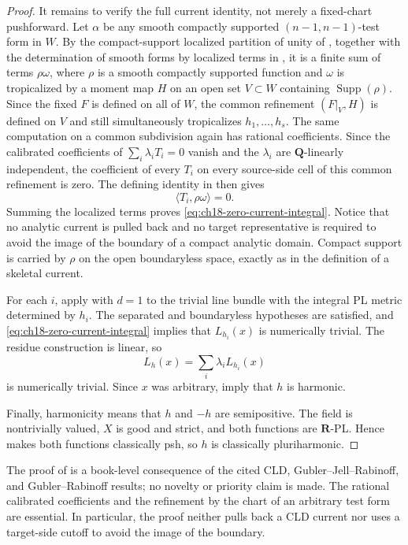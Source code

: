 \begin{proof}
It remains to verify the full current identity, not merely a fixed-chart
pushforward.  Let \(\alpha\) be any smooth compactly supported
\((n-1,n-1)\)-test form in \(W\).  By the compact-support localized partition of
unity of \cite[Corollary~6.2.8]{CLD25}, together with the determination of
smooth forms by localized terms in \cite[Lemma~7.2.5]{CLD25}, it is a
finite sum of terms \(\rho\omega\), where \(\rho\) is a smooth compactly
supported function and \(\omega\) is tropicalized by a moment map \(H\) on an
open set \(V\subset W\) containing
\(\operatorname{Supp}(\rho)\).  Since the fixed \(F\) is defined on all of \(W\),
the common refinement \((F|_V,H)\) is defined on \(V\) and still simultaneously
tropicalizes \(h_1,\ldots,h_s\).  The same computation on a common subdivision
again has rational coefficients.  Since the calibrated coefficients of
\(\sum_i\lambda_iT_i=0\) vanish and the \(\lambda_i\) are \(\mathbf Q\)-linearly
independent, the coefficient of every \(T_i\) on every source-side cell of
this common refinement is zero.  The defining identity in
\cite[Definition~7.5.1]{CLD25} then gives
\[
                         \langle T_i,\rho\omega\rangle=0.
\]
Summing the localized terms proves \eqref{eq:ch18-zero-current-integral}.
Notice that no analytic current is pulled back and no target representative
is required to avoid the image of the boundary of a compact analytic
domain.  Compact support is carried by \(\rho\) on the open boundaryless
space, exactly as in the definition of a skeletal current.

For each \(i\), apply \cite[Theorem~18.8.4]{CLD25} with \(d=1\) to the trivial
line bundle with the integral PL metric determined by \(h_i\).  The separated
and boundaryless hypotheses are satisfied, and
\eqref{eq:ch18-zero-current-integral} implies that \(L_{h_i}(x)\) is
numerically trivial.  The residue construction is linear, so
\[
                         L_h(x)=\sum_i\lambda_iL_{h_i}(x)
\]
is numerically trivial.  Since \(x\) was arbitrary,
\cite[Proposition~7.1 and Definition~7.2]{GJR26} imply that \(h\) is harmonic.

Finally, harmonicity means that \(h\) and \(-h\) are semipositive.  The field is
nontrivially valued, \(X\) is good and strict, and both functions are
\(\mathbf R\)-PL.  Hence \cite[Theorem~4.3]{GR25Classical} makes both functions
classically psh, so \(h\) is classically pluriharmonic.
\end{proof}

The proof of  is a book-level
consequence of the cited CLD, Gubler--Jell--Rabinoff, and
Gubler--Rabinoff results; no novelty or priority claim is made.  The
rational calibrated coefficients and the refinement by the chart of an
arbitrary test form are essential.  In particular, the proof neither pulls
back a CLD current nor uses a target-side cutoff to avoid the image of the
boundary.

